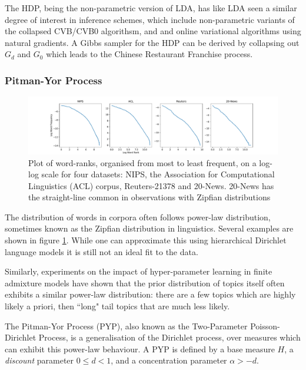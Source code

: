 The HDP, being the non-parametric version of LDA, has like LDA seen a similar degree of interest in inference schemes, which include non-parametric variants of the collapsed CVB/CVB0 algorithsm\cite{Sato2012a}, and and online variational algorithms using natural gradients\cite{Wang2011a}. A Gibbs sampler for the HDP can be derived by collapsing out $G_d$ and $G_0$ which leads to the Chinese Restaurant Franchise process\cite{Teh2006}.

\subsubsection{Pitman-Yor Process}
\begin{figure}
  \centering
    \hspace*{-1.5cm}\includegraphics[width=1.25\textwidth]{./Chap1/plots/zipfian_words.pdf}
  \caption{Plot of word-ranks, organised from most to least frequent, on a log-log scale for four datasets: NIPS, the Association for Computational Linguistics (ACL) corpus, Reuters-21378 and 20-News. 20-News has the straight-line common in observations with Zipfian distributions}
  \label{fig:zipfian-words}
\end{figure}
The distribution of words in corpora often follows power-law distribution, sometimes known as the Zipfian distribution in linguistics\cite{Montemurro2000}. Several examples are shown in figure \ref{fig:zipfian-words}. While one can approximate this using hierarchical Dirichlet language models\cite{MacKay1995} it is still not an ideal fit to the data.

Similarly, experiments on the impact of hyper-parameter learning in finite admixture models have shown that the prior distribution of topics itself often exhibits a similar power-law distribution: there are a few topics which are highly likely a priori, then ``long" tail topics that are  much less likely\cite{Wallach2009a}.

The Pitman-Yor Process (PYP), also known as the Two-Parameter Poisson-Dirichlet Process, is a generalisation of the Dirichlet process, over measures which can exhibit this power-law behaviour. A PYP is defined by a base measure $H$, a \emph{discount} parameter $0 \leq d < 1$, and a concentration parameter $\alpha > -d$. 

